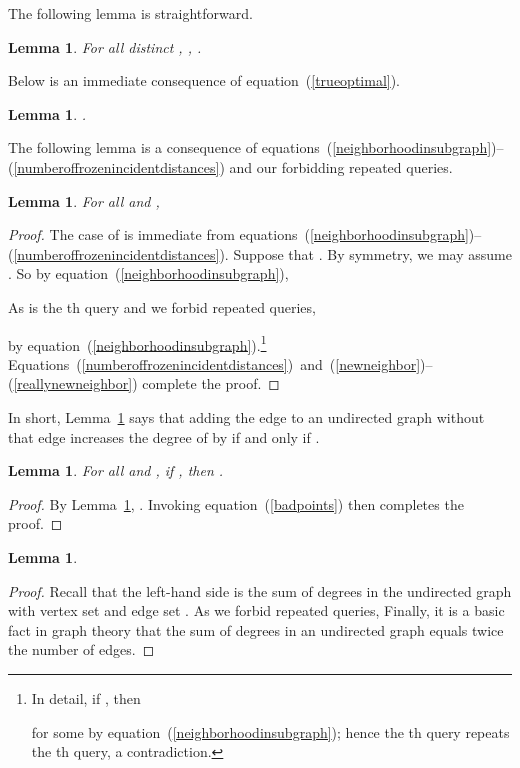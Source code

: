 \documentclass[letterpaper,12pt]{article}
\newtheorem{lemma}[theorem]{Lemma}
\begin{document}
The following lemma is straightforward.

\begin{lemma}\label{distancesarezeroto4}
For all distinct , ,
.
\end{lemma}

Below is an immediate consequence of equation~(\ref{trueoptimal}).

\begin{lemma}\label{optimalisinpreservedregion}
.
\end{lemma}

The following lemma is a consequence of
equations~(\ref{neighborhoodinsubgraph})--(\ref{numberoffrozenincidentdistances}) and
our
forbidding
repeated queries.

\begin{lemma}\label{monotonicity}
For all  and ,

\end{lemma}
\begin{proof}
The case of  is immediate from
equations~(\ref{neighborhoodinsubgraph})--(\ref{numberoffrozenincidentdistances}).
Suppose that .
By symmetry,
we may assume
.
So by equation~(\ref{neighborhoodinsubgraph}),

As
 is the th query
and we
forbid
repeated
queries,

by equation~(\ref{neighborhoodinsubgraph}).\footnote{In detail,
if , then

for some  by
equation~(\ref{neighborhoodinsubgraph}); hence the th query 
repeats the th query, a contradiction.}
Equations~(\ref{numberoffrozenincidentdistances})~and~(\ref{newneighbor})--(\ref{reallynewneighbor})
complete the
proof.
\end{proof}

In short, Lemma~\ref{monotonicity} says that adding the edge 
to an undirected graph without that edge increases the degree of 
by  if and only if .



\begin{lemma}\label{monotonicitysame}
For all  and ,
if , then
.
\end{lemma}
\begin{proof}
By Lemma~\ref{monotonicity}, .
Invoking equation~(\ref{badpoints}) then completes the proof.
\end{proof}

\begin{lemma}\label{sumofdegrees}

\end{lemma}
\begin{proof}
Recall that the left-hand side
is the sum of degrees in the undirected graph with vertex set 
and edge set .
As we
forbid
repeated queries, 
Finally, it is a basic fact in graph
theory that
the sum of degrees in an undirected graph equals
twice the number of edges.
\end{proof}
\end{document}

